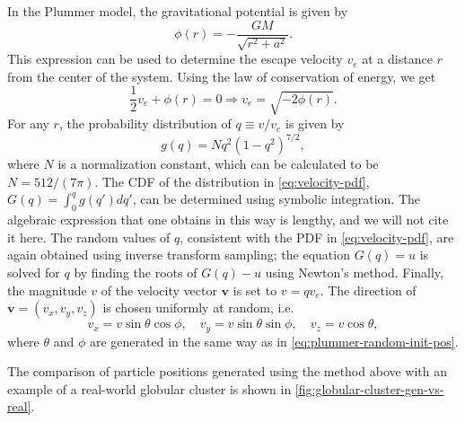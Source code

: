 In the Plummer model, the gravitational potential is given by
\begin{equation*}
    \phi(r) = -\frac{GM}{\sqrt{r^2 + a^2}}.
\end{equation*}
This expression can be used to determine the escape velocity \( v_e \) at a distance \( r \) from the center of the system.
Using the law of conservation of energy, we get
\begin{equation*}
    \frac{1}{2}v_e + \phi(r) = 0 \Rightarrow v_e = \sqrt{-2\phi(r)}.
\end{equation*}
For any $r$, the probability distribution of $q \equiv v/v_e$ is given by \cite{Aarseth1974Comparison}
\begin{equation}\label{eq:velocity-pdf}
    g(q) = N q^2(1-q^2)^{7/2},
\end{equation}
where $N$ is a normalization constant, which can be calculated to be $N = 512 / (7\pi)$.
The CDF of the distribution in \autoref{eq:velocity-pdf}, $G(q) = \int_0^q g(q') dq'$, can be determined using symbolic integration.
The algebraic expression that one obtains in this way is lengthy, and we will not cite it here.
The random values of $q$, consistent with the PDF in \autoref{eq:velocity-pdf}, are again obtained using inverse transform sampling;
the equation $G(q) = u$ is solved for $q$ by finding the roots of $G(q) - u$ using Newton's method.
Finally, the magnitude $v$ of the velocity vector $\mathbf{v}$ is set to $v = qv_e$.
The direction of $\mathbf{v} = (v_x, v_y, v_z)$ is chosen uniformly at random, i.e.
\begin{equation*}
    v_x = v\sin\theta \cos\phi, \quad v_y = v\sin\theta\sin\phi, \quad v_z = v\cos\theta,
\end{equation*}
where $\theta$ and $\phi$ are generated in the same way as in \autoref{eq:plummer-random-init-pos}.

The comparison of particle positions generated using the method above with an example of a real-world globular cluster is shown in \autoref{fig:globular-cluster-gen-vs-real}.
